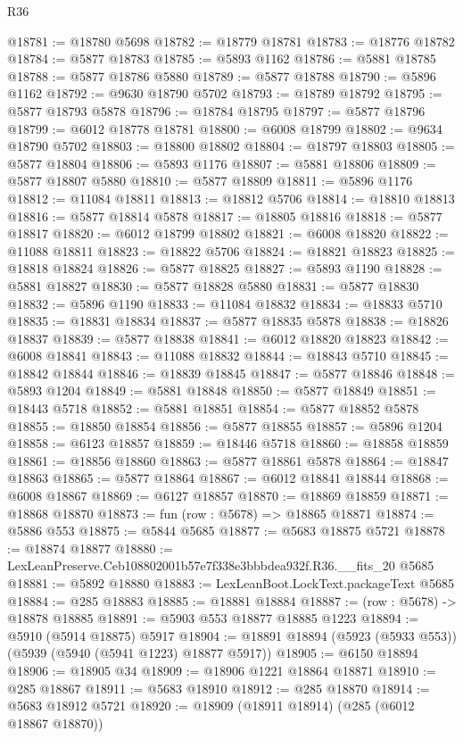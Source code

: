 \begin{lexlean}{R36}
\begin{coremodule}
@18781 := @18780 @5698
@18782 := @18779 @18781
@18783 := @18776 @18782
@18784 := @5877 @18783
@18785 := @5893 @1162
@18786 := @5881 @18785
@18788 := @5877 @18786 @5880
@18789 := @5877 @18788
@18790 := @5896 @1162
@18792 := @9630 @18790 @5702
@18793 := @18789 @18792
@18795 := @5877 @18793 @5878
@18796 := @18784 @18795
@18797 := @5877 @18796
@18799 := @6012 @18778 @18781
@18800 := @6008 @18799
@18802 := @9634 @18790 @5702
@18803 := @18800 @18802
@18804 := @18797 @18803
@18805 := @5877 @18804
@18806 := @5893 @1176
@18807 := @5881 @18806
@18809 := @5877 @18807 @5880
@18810 := @5877 @18809
@18811 := @5896 @1176
@18812 := @11084 @18811
@18813 := @18812 @5706
@18814 := @18810 @18813
@18816 := @5877 @18814 @5878
@18817 := @18805 @18816
@18818 := @5877 @18817
@18820 := @6012 @18799 @18802
@18821 := @6008 @18820
@18822 := @11088 @18811
@18823 := @18822 @5706
@18824 := @18821 @18823
@18825 := @18818 @18824
@18826 := @5877 @18825
@18827 := @5893 @1190
@18828 := @5881 @18827
@18830 := @5877 @18828 @5880
@18831 := @5877 @18830
@18832 := @5896 @1190
@18833 := @11084 @18832
@18834 := @18833 @5710
@18835 := @18831 @18834
@18837 := @5877 @18835 @5878
@18838 := @18826 @18837
@18839 := @5877 @18838
@18841 := @6012 @18820 @18823
@18842 := @6008 @18841
@18843 := @11088 @18832
@18844 := @18843 @5710
@18845 := @18842 @18844
@18846 := @18839 @18845
@18847 := @5877 @18846
@18848 := @5893 @1204
@18849 := @5881 @18848
@18850 := @5877 @18849
@18851 := @18443 @5718
@18852 := @5881 @18851
@18854 := @5877 @18852 @5878
@18855 := @18850 @18854
@18856 := @5877 @18855
@18857 := @5896 @1204
@18858 := @6123 @18857
@18859 := @18446 @5718
@18860 := @18858 @18859
@18861 := @18856 @18860
@18863 := @5877 @18861 @5878
@18864 := @18847 @18863
@18865 := @5877 @18864
@18867 := @6012 @18841 @18844
@18868 := @6008 @18867
@18869 := @6127 @18857
@18870 := @18869 @18859
@18871 := @18868 @18870
@18873 := fun (row : @5678) => @18865 @18871
@18874 := @5886 @553
@18875 := @5844 @5685
@18877 := @5683 @18875 @5721
@18878 := @18874 @18877
@18880 := LexLeanPreserve.Ceb108802001b57e7f338e3bbbdea932f.R36.__fits_20 @5685
@18881 := @5892 @18880
@18883 := LexLeanBoot.LockText.packageText @5685
@18884 := @285 @18883
@18885 := @18881 @18884
@18887 := (row : @5678) -> @18878 @18885
@18891 := @5903 @553 @18877 @18885 @1223
@18894 := @5910 (@5914 @18875) @5917
@18904 := @18891 @18894 (@5923 (@5933 @553)) (@5939 (@5940 (@5941 @1223) @18877 @5917))
@18905 := @6150 @18894
@18906 := @18905 @34
@18909 := @18906 @1221 @18864 @18871
@18910 := @285 @18867
@18911 := @5683 @18910
@18912 := @285 @18870
@18914 := @5683 @18912 @5721
@18920 := @18909 (@18911 @18914) (@285 (@6012 @18867 @18870))

\end{coremodule}
\end{lexlean}
